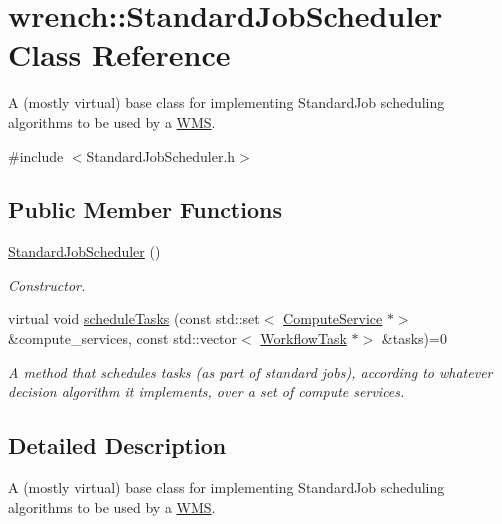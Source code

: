 \hypertarget{classwrench_1_1_standard_job_scheduler}{}\section{wrench\+:\+:Standard\+Job\+Scheduler Class Reference}
\label{classwrench_1_1_standard_job_scheduler}


A (mostly virtual) base class for implementing Standard\+Job scheduling algorithms to be used by a \hyperlink{classwrench_1_1_w_m_s}{W\+MS}.  




{\ttfamily \#include $<$Standard\+Job\+Scheduler.\+h$>$}

\subsection*{Public Member Functions}
\begin{DoxyCompactItemize}
\item 
\mbox{\label{classwrench_1_1_standard_job_scheduler_ac71c8f05963604731837d324061bde0b}} 
\hyperlink{classwrench_1_1_standard_job_scheduler_ac71c8f05963604731837d324061bde0b}{Standard\+Job\+Scheduler} ()
\begin{DoxyCompactList}\small\item\em Constructor. \end{DoxyCompactList}\item 
virtual void \hyperlink{classwrench_1_1_standard_job_scheduler_a1ef07acfece4706f7f172c740a8015c3}{schedule\+Tasks} (const std\+::set$<$ \hyperlink{classwrench_1_1_compute_service}{Compute\+Service} $\ast$$>$ \&compute\+\_\+services, const std\+::vector$<$ \hyperlink{classwrench_1_1_workflow_task}{Workflow\+Task} $\ast$$>$ \&tasks)=0
\begin{DoxyCompactList}\small\item\em A method that schedules tasks (as part of standard jobs), according to whatever decision algorithm it implements, over a set of compute services. \end{DoxyCompactList}\end{DoxyCompactItemize}


\subsection{Detailed Description}
A (mostly virtual) base class for implementing Standard\+Job scheduling algorithms to be used by a \hyperlink{classwrench_1_1_w_m_s}{W\+MS}. 

